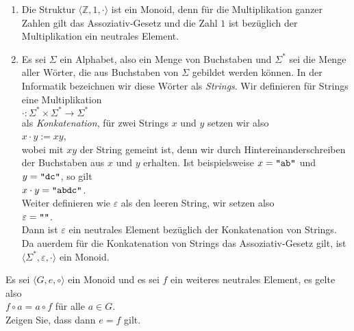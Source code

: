 \examples
\begin{enumerate}
\item Die Struktur $\langle \mathbb{Z}, 1, \cdot \rangle$ ist ein Monoid, denn f\"{u}r die Multiplikation
      ganzer Zahlen gilt das Assoziativ-Gesetz und die Zahl $1$ ist bez\"{u}glich der Multiplikation ein
      neutrales Element.
\item Es sei $\Sigma$ ein Alphabet, also ein Menge von Buchstaben und $\Sigma^*$ sei die Menge aller
      W\"{o}rter, die aus Buchstaben von $\Sigma$ gebildet werden k\"{o}nnen.  In der Informatik bezeichnen
      wir diese W\"{o}rter als \emph{Strings}.  Wir definieren f\"{u}r Strings eine Multiplikation
      \\[0.2cm]
      \hspace*{1.3cm}
      $\cdot: \Sigma^* \times \Sigma^* \rightarrow \Sigma^*$
      \\[0.2cm]
      als \emph{Konkatenation}, f\"{u}r zwei Strings $x$ und $y$ setzen wir also
      \\[0.2cm]
      \hspace*{1.3cm}
      $x \cdot y := xy$,
      \\[0.2cm]
      wobei mit $xy$ der String gemeint ist, denn wir durch Hintereinanderschreiben der Buchstaben
      aus $x$ und $y$ erhalten.  Ist beispielsweise $x = \texttt{\symbol{34}ab\symbol{34}}$ und $y = \texttt{\symbol{34}dc\symbol{34}}$,
      so gilt 
      \\[0.2cm]
      \hspace*{1.3cm}
      $x \cdot y = \texttt{\symbol{34}abdc\symbol{34}}$.
      \\[0.2cm]
      Weiter definieren wie $\varepsilon$ als den leeren String, wir setzen also
      \\[0.2cm]
      \hspace*{1.3cm}
      $\varepsilon = \texttt{\symbol{34}\symbol{34}}$.
      \\[0.2cm]
      Dann ist $\varepsilon$ ein neutrales Element bez\"{u}glich der Konkatenation von Strings.  Da
      au\3erdem f\"{u}r die Konkatenation von Strings das Assoziativ-Gesetz gilt, ist $\langle \Sigma^*, \varepsilon, \cdot \rangle$ ein
      Monoid. 
      \eox
\end{enumerate}

\exercise
Es sei $\langle G, e, \circ \rangle$ ein Monoid und es sei $f$ ein weiteres neutrales Element, es gelte also
\\[0.2cm]
\hspace*{1.3cm}
$f \circ a = a \circ f$ \quad f\"{u}r alle $a \in G$.
\\[0.2cm]
Zeigen Sie, dass dann $e = f$ gilt.  
\eox



